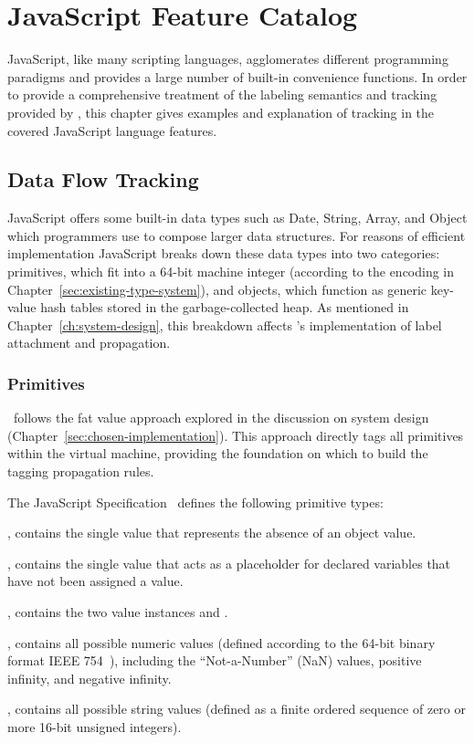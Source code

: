
\chapter{JavaScript Feature Catalog}

JavaScript, like many scripting languages, agglomerates different programming paradigms and provides a large number of built-in convenience functions.
In order to provide a comprehensive treatment of the labeling semantics and tracking provided by \FlowCore, this chapter gives examples and explanation of tracking in the covered JavaScript language features.

\section{Data Flow Tracking}
\label{sec:data-flow-tracking}

JavaScript offers some built-in data types such as Date, String, Array, and Object which programmers use to compose larger data structures.
For reasons of efficient implementation JavaScript breaks down these data types into two categories: primitives, which fit into a 64-bit machine integer (according to the encoding in Chapter~\ref{sec:existing-type-system}), and objects, which function as generic key-value hash tables stored in the garbage-collected heap.
As mentioned in Chapter~\ref{ch:system-design}, this breakdown affects \FlowCore's implementation of label attachment and propagation.

\subsection{Primitives}

\FlowCore\ follows the fat value approach explored in the discussion on system design (Chapter~\ref{sec:chosen-implementation}).
This approach directly tags all primitives within the virtual machine, providing the foundation on which to build the tagging propagation rules.

The JavaScript Specification~\cite{ecma} defines the following primitive types:
\begin{description}
  \item \textbf{}, contains the single value  that represents the absence of an object value.
  \item \textbf{}, contains the single value  that acts as a placeholder for declared variables that have not been assigned a value.
  \item \textbf{}, contains the two value instances  and .
  \item \textbf{}, contains all possible numeric values (defined according to the 64-bit binary format IEEE 754~\cite{ieee754}), including the ``Not-a-Number'' (NaN) values, positive infinity, and negative infinity.
  \item \textbf{}, contains all possible string values (defined as a finite ordered sequence of zero or more 16-bit unsigned integers).
\end{description}

